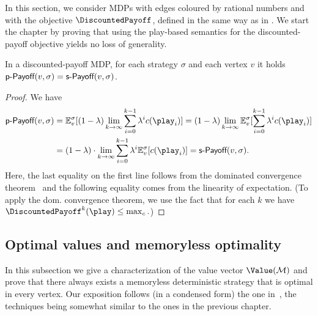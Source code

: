 In this section, we consider MDPs with edges coloured by rational numbers 
and with the objective $\DiscountedPayoff$, defined in the same way as in 
. We start the chapter by proving that using the play-based semantics for the discounted-payoff objective yields no loss of generality. 

\begin{lemma}
\label{5-lem:disc-step-one}
In a discounted-payoff MDP, for each strategy $ \sigma $ and each vertex $ v $ it holds $ \textsf{p-Payoff}(v, \sigma) = \textsf{s-Payoff}(v, \sigma) $.
\end{lemma}
\begin{proof}
We have 
\begin{align*} \playPay(v,\sigma) &= \expv^\sigma_v[(1-\lambda)\lim_{k \rightarrow \infty} \sum_{i=0}^{k-1}\lambda^i \colouring(\play_i) ] = (1-\lambda) \lim_{k \rightarrow \infty} \expv^\sigma_v[\sum_{i=0}^{k-1}\lambda^i \colouring(\play_i) ] 
\\
&= (1-\lambda)\cdot\lim_{k \rightarrow \infty} \sum_{i=0}^{k-1}\lambda^i\expv^\sigma_v[ \colouring(\play_i) ] = \stepPay(v, \sigma).
\end{align*}
%
Here, the last equality on the first line follows from the dominated convergence theorem~\cite[Theorem 1.6.9]{Ash&Doleans-Dade:2000} and the following equality comes from the linearity of expectation. (To apply the dom. convergence 
theorem, we use the fact that for each 
$k$ we have $\DiscountedPayoff^{k}(\play)\leq \maxc.
$)
\end{proof}

\subsection*{Optimal values and memoryless optimality}

 In this subsection we give a 
characterization of the value vector $\Value(\mdp)$ and prove that there always exists a 
memoryless deterministic strategy that is optimal in every vertex. Our 
exposition follows (in a condensed form) the one in~\cite{Puterman:2005}, the techniques 
being somewhat similar to the ones in the previous chapter.

%

